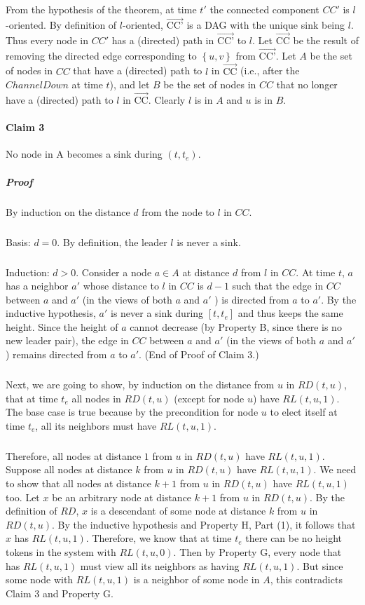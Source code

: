 \subparagraph{}From the hypothesis of the theorem, at time $t'$ the connected component $CC'$ is $l$-oriented. By definition of $l$-oriented, $\overrightarrow{\text {CC'}}$ is a DAG with the unique sink being $l$. Thus every node in $CC'$ has a (directed) path in $\overrightarrow{\text {CC'}}$ to $l$. Let $\overrightarrow{\text{CC}}$ be the result of removing the directed edge corresponding to $\left\lbrace  u, v\right\rbrace $ from $\overrightarrow{\text {CC'}}$. Let $A$ be the set of nodes in $CC$ that have a (directed) path to $l$ in $\overrightarrow{\text{CC}}$ (i.e., after the $ChannelDown$ at time $t$), and let $B$ be the set of nodes in $CC$ that no longer have a (directed) path to $l$ in $\overrightarrow{\text {CC}}$. Clearly $l$ is in $A$ and $u$ is in $B$.

\paragraph{Claim 3}No node in A becomes a sink during $(t,t_e )$.
\subparagraph{Proof}By induction on the distance $d$ from the node to $l$ in $CC$.
\subparagraph{}Basis: $d = 0$. By definition, the leader $l$ is never a sink.
\subparagraph{}Induction: $d > 0$. Consider a node $a \in A$ at distance $d$ from $l$ in $CC$. At time $t$, $a$ has a neighbor $a'$ whose distance to $l$ in $CC$ is $d - 1$ such that the edge in $CC$ between $a$ and $a'$ (in the views of both $a$ and $a'$ ) is directed from $a$ to $a'$. By the inductive hypothesis, $a'$ is never a sink during $\left[ t,t_e \right] $ and thus keeps the same height. Since the height of $a$ cannot decrease (by Property B, since there is no new leader pair), the edge in $CC$ between $a$ and $a'$ (in the views of both $a$ and $a'$) remains directed from $a$ to $a'$. (End of Proof of Claim 3.)
\subparagraph{}Next, we are going to show, by induction on the distance from $u$ in $RD (t, u)$, that at time $t_e$ all nodes in $RD (t, u)$ (except for node $u$) have $RL (t, u, 1)$. The base case is true because by the precondition for node $u$ to elect itself at time $t_e$, all its neighbors must have $RL (t, u, 1)$.
\subparagraph{}Therefore, all nodes at distance $1$ from $u$ in $RD (t, u)$ have $RL (t, u, 1)$. Suppose all nodes at distance $k$ from $u$ in $RD (t, u)$ have $RL (t, u, 1)$. We need to show that all nodes at distance $k + 1$ from $u$ in $RD (t, u)$ have $RL (t, u, 1)$ too. Let $x$ be an arbitrary node at distance $k + 1$ from $u$ in $RD (t, u)$. By the definition of $RD$, $x$ is a descendant of some node at distance $k$ from $u$ in $RD (t, u)$. By the inductive hypothesis and Property H, Part (1), it follows that $x$ has $RL (t, u, 1)$. Therefore, we know that at time $t_e$ there can be no height tokens in the system with $RL (t, u, 0)$. Then by Property G, every node that has $RL (t, u, 1)$ must view all its neighbors as having $RL (t, u, 1)$. But since some node with $RL (t, u, 1)$ is a neighbor of some node in $A$, this contradicts Claim 3 and Property G.
